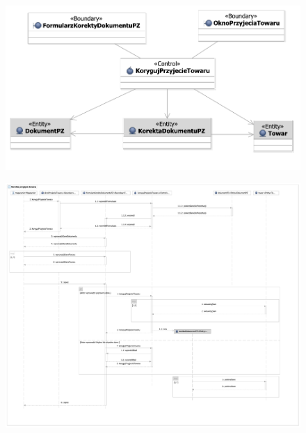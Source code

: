 \begin{figure}[H]
  \centering
  \includegraphics[angle=\ecbangle, scale=\ecbscale]{../img/usecase/pu28ecb.pdf}
  \caption{}
\end{figure}
\newpage
\begin{figure}[H]
  \centering
  \includegraphics[angle=\seqangle, scale=0.35]{../img/usecase/pu28seq.pdf}
  \caption{}
\end{figure}
\newpage






